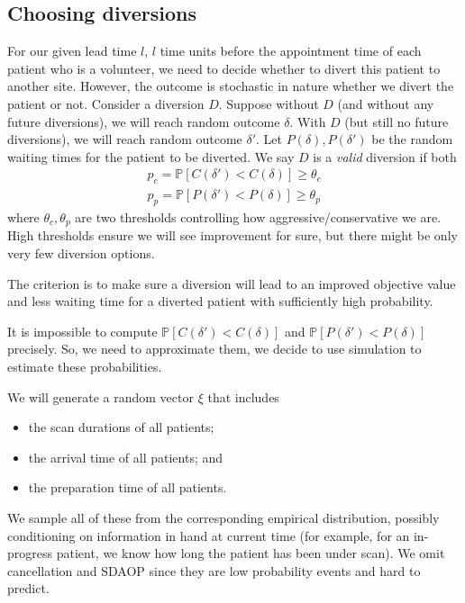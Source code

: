 \subsection{Choosing diversions}

For our given lead time $l$, $l$ time units before the appointment
time of each patient who is a volunteer, we need to
decide whether to divert this patient to another site. However, the
outcome is stochastic in
nature whether we divert the patient or not. Consider a diversion
$D$. Suppose without $D$ (and without any future diversions), we will
reach random outcome $\delta$. With $D$ (but still no future
diversions), we will reach random outcome $\delta'$. Let
$P(\delta), P(\delta')$ be the random waiting times for the patient 
to be diverted. We say $D$ is a \textit{valid} diversion if both
\begin{align*}
  p_c = \mathbb{P}[C(\delta') < C(\delta)] \ge \theta_c   \\
  p_p = \mathbb{P}[P(\delta') < P(\delta)] \ge \theta_p
\end{align*}
where $\theta_c, \theta_p$ are two thresholds controlling how
aggressive/conservative we are. High thresholds ensure we will
see improvement for sure, but there might be only very few
diversion options.

The criterion is to make sure a diversion will lead to an
improved objective value and less waiting time for a diverted
patient with sufficiently high probability.

It is impossible to compute $\mathbb{P}[C(\delta') < C(\delta)]$ and
$\mathbb{P}[P(\delta') < P(\delta)]$ precisely. So, we need to approximate
them, we decide to use simulation to estimate these probabilities.

We will generate a random vector $\xi$ that includes
\begin{itemize}
\item the scan durations of all patients;
\item the arrival time of all patients; and
\item the preparation time of all patients.
\end{itemize}
We sample all of these from the corresponding empirical distribution,
possibly conditioning on information in hand at current time
(for example, for an in-progress patient, we know how long the patient
has been under scan). We omit cancellation and SDAOP since
they are low probability events and hard to predict.

